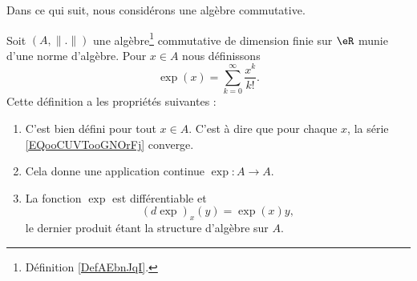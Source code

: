 Dans ce qui suit, nous considérons une algèbre commutative.
\begin{propositionDef}       \label{DEFooSFDUooMNsgZY}
    Soit \( (A,\| . \|)\) une algèbre\footnote{Définition \ref{DefAEbnJqI}.} commutative de dimension finie sur \( \eR\) munie d'une norme d'algèbre. Pour \( x\in A\) nous définissons
    \begin{equation}        \label{EQooCUVTooGNOrFj}
        \exp(x)=\sum_{k=0}^{\infty}\frac{ x^k }{ k! }.
    \end{equation}
    Cette définition a les propriétés suivantes :
    \begin{enumerate}
        \item
            C'est bien défini pour tout \( x\in A\). C'est à dire que pour chaque \( x\), la série \eqref{EQooCUVTooGNOrFj} converge.
        \item
            Cela donne une application continue \( \exp\colon A\to A\).
        \item       \label{ITEMooGGVAooVfhGuu}
            La fonction \( \exp\) est différentiable et
            \begin{equation}        \label{EQooKWBUooLUdBAw}
                (d\exp)_x(y)=\exp(x)y,
            \end{equation}
            le dernier produit étant la structure d'algèbre sur \( A\).
    \end{enumerate}
\end{propositionDef}

